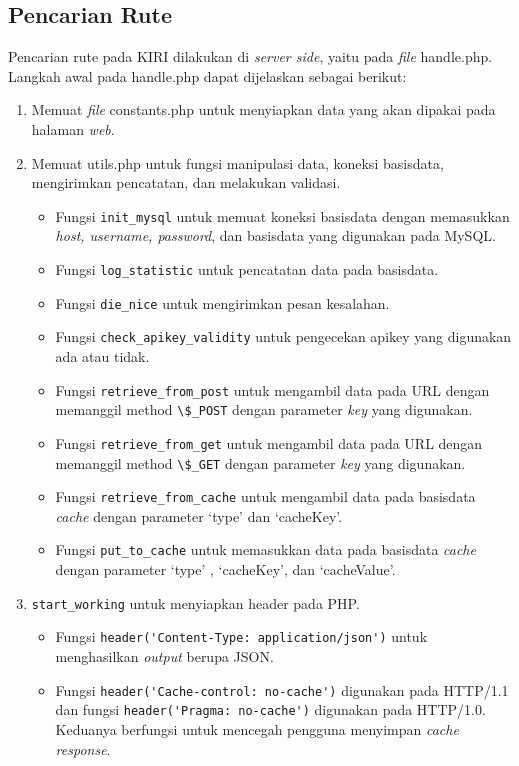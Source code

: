 \subsection{Pencarian Rute}
Pencarian rute pada KIRI dilakukan di \textit{server side}, yaitu pada \textit{file} handle.php. Langkah awal pada handle.php dapat dijelaskan sebagai berikut:
\begin{enumerate}
	\item Memuat \textit{file} constants.php untuk menyiapkan data yang akan dipakai pada halaman \textit{web}.
	\item Memuat utils.php untuk fungsi manipulasi data, koneksi basisdata, mengirimkan pencatatan, dan melakukan validasi.
	\begin{itemize}
		\item Fungsi \verb!init_mysql! untuk memuat koneksi basisdata dengan memasukkan \textit{host, username, password}, dan basisdata yang digunakan pada MySQL.
		\item Fungsi \verb!log_statistic! untuk pencatatan data pada basisdata.
		\item Fungsi \verb!die_nice! untuk mengirimkan pesan kesalahan.
		\item Fungsi \verb!check_apikey_validity! untuk pengecekan apikey yang digunakan ada atau tidak.
		\item Fungsi \verb!retrieve_from_post! untuk mengambil data pada URL dengan memanggil method \verb!\$_POST! dengan parameter \textit{key} yang digunakan.
		\item Fungsi \verb!retrieve_from_get! untuk mengambil data pada URL dengan memanggil method \verb!\$_GET! dengan parameter \textit{key} yang digunakan.
		\item Fungsi \verb!retrieve_from_cache! untuk mengambil data pada basisdata \textit{cache} dengan parameter `type' dan `cacheKey'.
		\item Fungsi \verb!put_to_cache! untuk memasukkan data pada basisdata \textit{cache} dengan parameter `type' , `cacheKey', dan `cacheValue'.
	\end{itemize}
	\item \verb!start_working! untuk menyiapkan header pada PHP.
	\begin{itemize}
		\item Fungsi \verb!header('Content-Type: application/json')! untuk menghasilkan \textit{output} berupa JSON.
		\item Fungsi \verb!header('Cache-control: no-cache')! digunakan pada HTTP/1.1 dan fungsi \verb!header('Pragma: no-cache')! digunakan pada HTTP/1.0. Keduanya berfungsi untuk mencegah pengguna menyimpan \textit{cache response}.

\end{itemize}
\end{enumerate}
